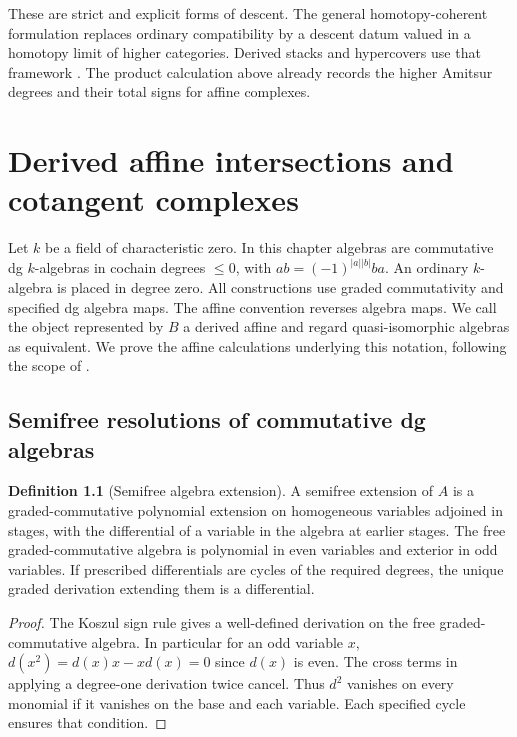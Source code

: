 \documentclass[11pt,oneside,openany]{book}
\theoremstyle{definition}
\newtheorem{definition}[theorem]{Definition}
\theoremstyle{remark}
\begin{document}
These are strict and explicit forms of descent. The general
homotopy-coherent formulation replaces ordinary compatibility by
a descent datum valued in a homotopy limit of higher categories.
Derived stacks and hypercovers use that framework
\cite[\S1.2.12]{hag}. The product calculation above already records
the higher Amitsur degrees and their total signs for affine
complexes.
\chapter{Derived affine intersections and cotangent complexes}
\label{ch:derived-affines}

Let \(k\) be a field of characteristic zero. In this chapter algebras
are commutative dg \(k\)-algebras in cochain degrees \(\leq0\),
with \(ab=(-1)^{|a||b|}ba\). An ordinary \(k\)-algebra is placed
in degree zero. All constructions use graded commutativity and
specified dg algebra maps. The affine convention reverses algebra
maps. We call the object represented by \(B\) a derived affine and
regard quasi-isomorphic algebras as equivalent. We prove the affine
calculations underlying this notation, following the scope of
\cite[\S\S2.2 and 4.1]{toen}.

\section{Semifree resolutions of commutative dg algebras}

\begin{definition}[Semifree algebra extension]\label{res:A01}
A semifree extension of \(A\) is a graded-commutative polynomial
extension on homogeneous variables adjoined in stages, with
the differential of a variable in the algebra at earlier stages.
The free graded-commutative algebra is polynomial in even variables
and exterior in odd variables. If prescribed differentials are
cycles of the required degrees, the unique graded derivation extending
them is a differential.
\end{definition}
\begin{proof}
The Koszul sign rule gives a well-defined derivation on the free
graded-commutative algebra. In particular for an odd variable \(x\),
\(d(x^2)=d(x)x-xd(x)=0\) since \(d(x)\) is even.
The cross terms in applying a degree-one derivation twice cancel.
Thus \(d^2\) vanishes on every monomial if it vanishes on the base
and each variable. Each specified cycle ensures that condition.
\end{proof}
\end{document}

